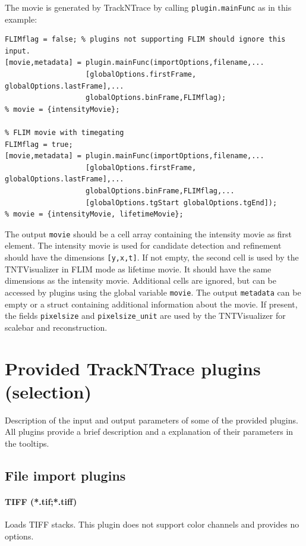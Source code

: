 \documentclass[11pt,onside]{report}
\numberwithin{equation}{chapter}
\begin{document}
The movie is generated by TrackNTrace by calling \texttt{plugin.mainFunc} as in this example:
\begin{lstlisting}[style=Matlab-editor]
% Normal intensity movie:
FLIMflag = false; % plugins not supporting FLIM should ignore this input.
[movie,metadata] = plugin.mainFunc(importOptions,filename,...
                   [globalOptions.firstFrame, globalOptions.lastFrame],...
                   globalOptions.binFrame,FLIMflag);
% movie = {intensityMovie};

% FLIM movie with timegating
FLIMflag = true;
[movie,metadata] = plugin.mainFunc(importOptions,filename,...
                   [globalOptions.firstFrame, globalOptions.lastFrame],...
                   globalOptions.binFrame,FLIMflag,...
                   [globalOptions.tgStart globalOptions.tgEnd]);
% movie = {intensityMovie, lifetimeMovie};
\end{lstlisting}

The output \texttt{movie} should be a cell array containing the intensity movie as first element. The intensity movie is used for candidate detection and refinement should have the dimensions \texttt{[y,x,t]}. If not empty, the second cell is used by the \textsf{TNTVisualizer} in FLIM mode as lifetime movie. It should have the same dimensions as the intensity movie. Additional cells are ignored, but can be accessed by plugins using the global variable \texttt{movie}. The output \texttt{metadata} can be empty or a struct containing additional information about the movie. If present, the fields \texttt{pixelsize} and \texttt{pixelsize\_unit} are used by the \textsf{TNTVisualizer} for scalebar and reconstruction.

\FloatBarrier

\section{Provided TrackNTrace plugins (selection)}
Description of the input and output parameters of some of the provided plugins. All plugins provide a brief description and a explanation of their parameters in the tooltips.
\subsection{File import plugins}\label{sec:importPlugin}
\paragraph{TIFF (*.tif;*.tiff)}
Loads TIFF stacks. This plugin does not support color channels and provides no options.
\end{document}

